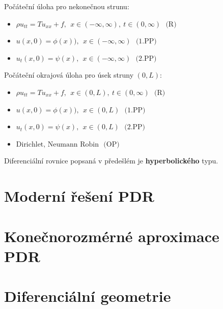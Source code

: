  Počáteční úloha pro nekonečnou strunu:
 \begin{itemize}
 \item $\rho u_{tt}=Tu_{xx}+f, \ \ x\in(-\infty,\infty), \ t\in(0,\infty) \ \ \ \textrm{(R)}$
 \item $u(x,0)=\phi(x)), \ \ x\in(-\infty,\infty) \ \ \ \textrm{(1.PP)}$
 \item $u_t (x,0)=\psi(x), \ \ x\in(-\infty,\infty)  \ \ \ \textrm{(2.PP)}$
 \end{itemize}
 
 Počáteční okrajová úloha pro úsek struny $(0,L)$:
 \begin{itemize}
 \item $ \rho u_{tt}=Tu_{xx}+f, \ \ x\in(0,L),\ t\in(0,\infty)  \ \ \ \textrm{(R)}$
 \item  $ u(x,0)=\phi(x)), \ \ x\in(0,L) \ \ \ \textrm{(1.PP)}$
 \item  $ u_t (x,0)=\psi(x), \ \ x\in(0,L)  \ \ \ \textrm{(2.PP)}$
 \item $\textrm{Dirichlet, Neumann Robin} \ \ \ \textrm{(OP)} $
 \end{itemize}
 
 Diferenciální rovnice popsaná v předešlém je \textbf{hyperbolického} typu.



\section{Moderní řešení PDR}

\section{Konečnorozmérné aproximace PDR}

\section{Diferenciální geometrie}
